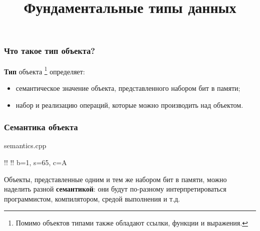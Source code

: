 \documentclass[compress, 8pt]{beamer}
\title{Фундаментальные типы данных}
\begin{document}
\frame[plain]{\titlepage}

\begin{frame}

    \frametitle{Что такое тип объекта?}

    \textbf{Тип} объекта
    \footnote{Помимо объектов типами также обладают
    ссылки, функции и выражения.}
    определяет:

    \begin{itemize}

        \item семантическое значение объекта, представленного
            набором бит в памяти;

        \item набор и реализацию операций, которые можно производить
            над объектом.

    \end{itemize}

\end{frame}

\begin{frame}[fragile]

    \frametitle{Семантика объекта}

        {semantics.cpp}

    \begin{terminalwindow}
!!
!!
b=1, s=65, c=A
    \end{terminalwindow}

    Объекты, представленные одним и тем же набором бит в памяти, можно
    наделить разной \textbf{семантикой}: они будут по-разному
    интерпретироваться программистом, компилятором, средой выполнения и т.д.

\end{frame}
\end{document}
